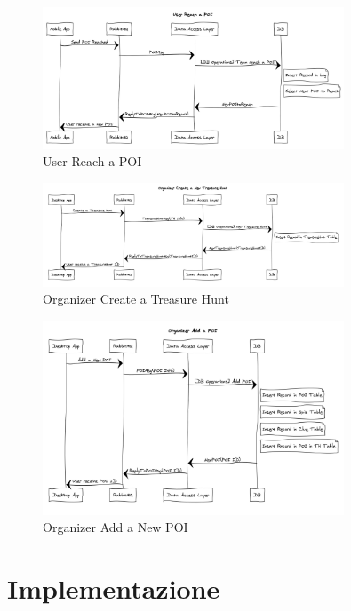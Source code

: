 \documentclass[12pt, italian]{article}
\begin{document}
\begin{figure}[H]
	\centering
	\includegraphics[width=0.8\textwidth]{img/SequenceDiagram/userReachAPOI.png}
	\caption{User Reach a POI}
\end{figure}

\begin{figure}[H]
	\centering
	\includegraphics[width=0.8\textwidth]{img/SequenceDiagram/organizerCreateTH.png}
	\caption{Organizer Create a Treasure Hunt}
\end{figure}

\begin{figure}[H]
	\centering
	\includegraphics[width=0.8\textwidth]{img/SequenceDiagram/organizerAddNewPOI.png}
	\caption{Organizer Add a New POI}
\end{figure}


\section{Implementazione}
\end{document}
